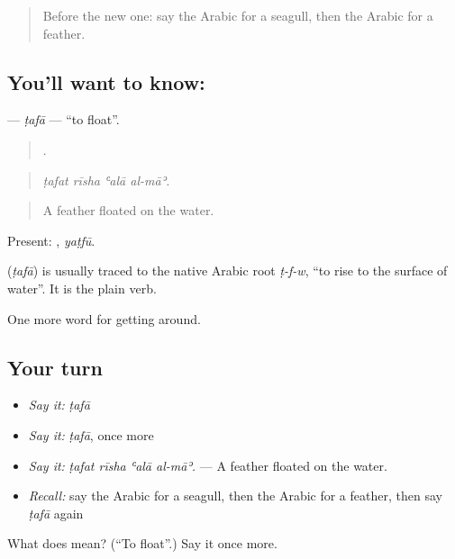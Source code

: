 \label{lesson:AR-C474-tafa}



\begin{quote}
Before the new one: say the Arabic for a seagull, then the Arabic for a feather.
\end{quote}

\subsection*{You'll want to know: }
\textbf{} — \emph{ṭafā} — \textquotedblleft{}to float\textquotedblright{}.

\begin{quote}
   .
\end{quote}

\begin{quote}
\emph{ṭafat rīsha ʿalā al-māʾ.}
\end{quote}

\begin{quote}
A feather floated on the water.
\end{quote}

Present: , \emph{yaṭfū}.

\begin{cousinweb}
\textbf{} (\emph{ṭafā}) is usually traced to the native Arabic root \emph{ṭ-f-w}, \textquotedblleft{}to rise to the surface of water\textquotedblright{}. It is the plain verb.
\end{cousinweb}

\begin{grammarlens}[title={What you've built}]
One more word for getting around.
\end{grammarlens}

\subsection*{Your turn}
\begin{itemize}
\raggedright
  \item \emph{Say it:} \emph{ṭafā}
  \item \emph{Say it:} \emph{ṭafā}, once more
  \item \emph{Say it:} \emph{ṭafat rīsha ʿalā al-māʾ.} — A feather floated on the water.
  \item \emph{Recall:} say the Arabic for a seagull, then the Arabic for a feather, then say \emph{ṭafā} again
\end{itemize}

\begin{tcolorbox}[breakable,colback=teal!4,colframe=teal!35!black,title={Before you move on}]
What does  mean? (\textquotedblleft{}To float\textquotedblright{}.) Say it once more.
\end{tcolorbox}
